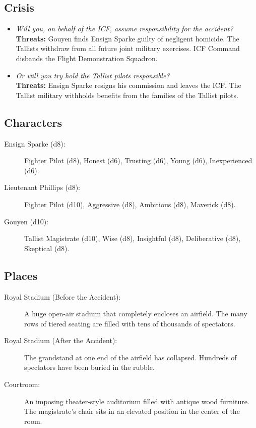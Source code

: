 \documentclass[11pt, a5paper, parskip=half-, DIV=12]{scrartcl}
\begin{document}
\subsection*{Crisis}
\begin{itemize}
	\item \textit{Will you, on behalf of the ICF, assume responsibility for the accident?} \textbf{Threats:} Gouyen finds Ensign Sparke guilty of negligent homicide. The Tallists withdraw from all future joint military exercises. ICF Command disbands the Flight Demonstration Squadron.
	\item \textit{Or will you try hold the Tallist pilots responsible?} \\ \textbf{Threats:} Ensign Sparke resigns his commission and leaves the ICF. The Tallist military withholds benefits from the families of the Tallist pilots.
\end{itemize}

\newpage

\subsection*{Characters}
\begin{description}
	\item[Ensign Sparke (d8):] Fighter Pilot (d8), Honest (d6), Trusting (d6), Young (d6), Inexperienced (d6).
	\item[Lieutenant Phillips (d8):] Fighter Pilot (d10), Aggressive (d8), Ambitious (d8), Maverick (d8).
	\item[Gouyen (d10):] Tallist Magistrate (d10), Wise (d8), Insightful (d8), Deliberative (d8), Skeptical (d8).
\end{description}

\subsection*{Places}
\begin{description}
	\item[Royal Stadium (Before the Accident):] A huge open-air stadium that completely encloses an airfield. The many rows of tiered seating are filled with tens of thousands of spectators. 
	\item[Royal Stadium (After the Accident):] The grandstand at one end of the airfield has collapsed. Hundreds of spectators have been buried in the rubble.
	\item[Courtroom:] An imposing theater-style auditorium filled with antique wood furniture. The magistrate's chair sits in an elevated position in the center of the room.
\end{description}
\end{document}
